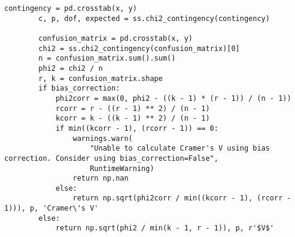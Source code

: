 \begin{lstlisting}[basicstyle=\tiny, style=py, caption={Compute Correlation Function}, label=lst:compute_correlation]
        contingency = pd.crosstab(x, y)
        c, p, dof, expected = ss.chi2_contingency(contingency)

        confusion_matrix = pd.crosstab(x, y)
        chi2 = ss.chi2_contingency(confusion_matrix)[0]
        n = confusion_matrix.sum().sum()
        phi2 = chi2 / n
        r, k = confusion_matrix.shape
        if bias_correction:
            phi2corr = max(0, phi2 - ((k - 1) * (r - 1)) / (n - 1))
            rcorr = r - ((r - 1) ** 2) / (n - 1)
            kcorr = k - ((k - 1) ** 2) / (n - 1)
            if min((kcorr - 1), (rcorr - 1)) == 0:
                warnings.warn(
                    "Unable to calculate Cramer's V using bias correction. Consider using bias_correction=False",
                    RuntimeWarning)
                return np.nan
            else:
                return np.sqrt(phi2corr / min((kcorr - 1), (rcorr - 1))), p, 'Cramer\'s V'
        else:
            return np.sqrt(phi2 / min(k - 1, r - 1)), p, r'$V$'
\end{lstlisting}

